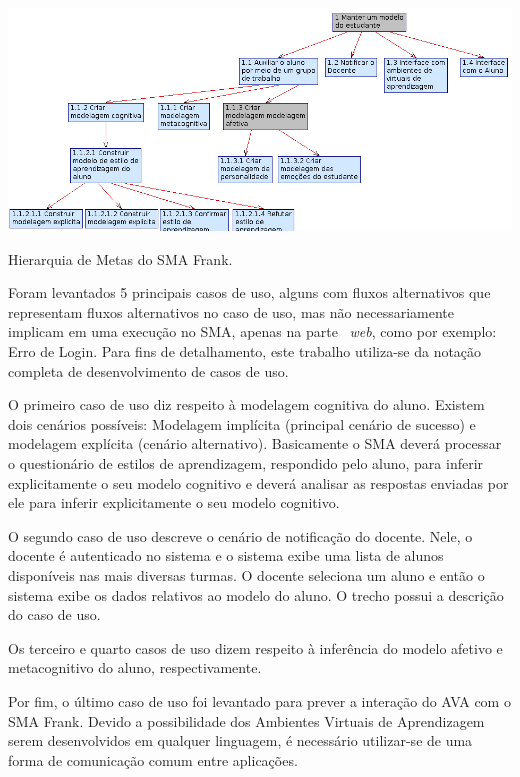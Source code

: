 \begin{table}
	\centering
	\includegraphics[scale=0.7]{images/metas-frank.png}
	\caption{Hierarquia de Metas do SMA Frank.}
	\label{fig:metas-frank}
\end{table}

Foram levantados 5 principais casos de uso, alguns com fluxos alternativos que representam fluxos alternativos no caso de uso, mas não necessariamente implicam em uma execução no SMA, apenas na parte ~\emph{web}, como por exemplo: Erro de Login. Para fins de detalhamento, este trabalho utiliza-se da notação completa de desenvolvimento de casos de uso.

O primeiro caso de uso diz respeito à modelagem cognitiva do aluno. Existem dois cenários possíveis: Modelagem implícita (principal cenário de sucesso) e modelagem explícita (cenário alternativo). Basicamente o SMA deverá processar o questionário de estilos de aprendizagem, respondido pelo aluno, para inferir explicitamente o seu modelo cognitivo e deverá analisar as respostas enviadas por ele para inferir explicitamente o seu modelo cognitivo.

O segundo caso de uso descreve o cenário de notificação do docente. Nele, o docente é autenticado no sistema e o sistema exibe uma lista de alunos disponíveis nas mais diversas turmas. O docente seleciona um aluno e então o sistema exibe os dados relativos ao modelo do aluno. O trecho possui a descrição do caso de uso.

Os terceiro e quarto casos de uso dizem respeito à inferência do modelo afetivo e metacognitivo do aluno, respectivamente.

Por fim, o último caso de uso foi levantado para prever a interação do AVA com o SMA Frank. Devido a possibilidade dos Ambientes Virtuais de Aprendizagem serem desenvolvidos em qualquer linguagem, é necessário utilizar-se de uma forma de comunicação comum entre aplicações.

